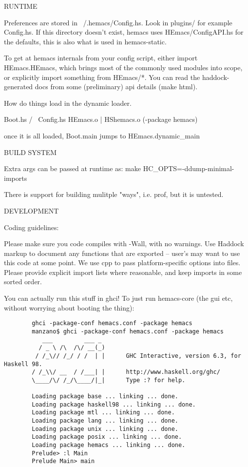 RUNTIME

Preferences are stored in ~/.hemacs/Config.hs. Look in plugins/ for
example Config.hs. If this directory doesn't exist, hemacs uses
HEmacs/ConfigAPI.hs for the defaults, this is also what is used in
hemacs-static.

To get at hemacs internals from your config script, either import
HEmacs.HEmacs, which brings most of the commonly used modules into
scope, or explicitly import something from HEmacs/*. You can read the
haddock-generated docs from some (preliminary) api details (make
html).

How do things load in the dynamic loader.
        
           Boot.hs
          /      \
      Config.hs HEmacs.o
                  |
                HShemacs.o (-package hemacs)

once it is all loaded, Boot.main jumps to HEmacs.dynamic\_main

BUILD SYSTEM

Extra args can be passed at runtime as: make HC\_OPTS=-ddump-minimal-imports

There is support for building mulitple "ways", i.e. prof, but it is
untested.

DEVELOPMENT

Coding guidelines:

Please make sure you code compiles with -Wall, with no warnings. Use
Haddock markup to document any functions that are exported -- user's
may want to use this code at some point. We use cpp to pass
platform-specific options into files. Please provide explicit import
lists where reasonable, and keep imports in some sorted order.

You can actually run this stuff in ghci! To just run hemacs-core (the gui etc,
without worrying about booting the thing):

\begin{verbatim}
        ghci -package-conf hemacs.conf -package hemacs
        manzano$ ghci -package-conf hemacs.conf -package hemacs
           ___         ___ _
          / _ \ /\  /\/ __(_)
         / /_\// /_/ / /  | |      GHC Interactive, version 6.3, for Haskell 98.
        / /_\\/ __  / /___| |      http://www.haskell.org/ghc/
        \____/\/ /_/\____/|_|      Type :? for help.

        Loading package base ... linking ... done.
        Loading package haskell98 ... linking ... done.
        Loading package mtl ... linking ... done.
        Loading package lang ... linking ... done.
        Loading package unix ... linking ... done.
        Loading package posix ... linking ... done.
        Loading package hemacs ... linking ... done.
        Prelude> :l Main
        Prelude Main> main
\end{verbatim}

